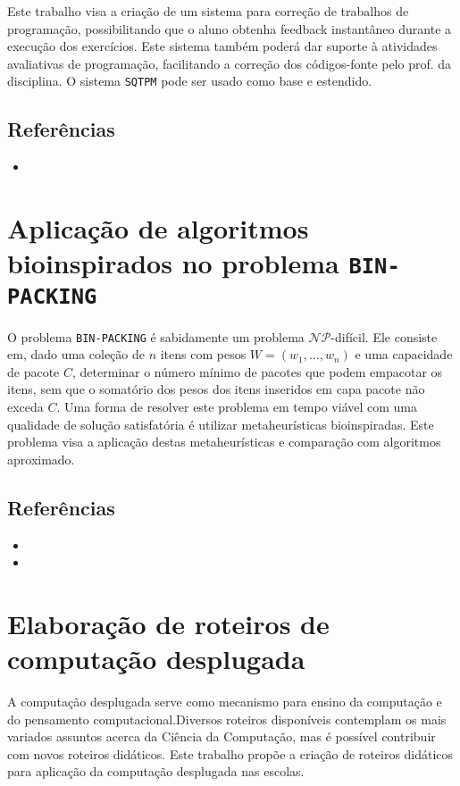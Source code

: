 \documentclass{article}
\begin{document}
Este trabalho visa a criação de um sistema para correção de trabalhos de programação, possibilitando que o aluno obtenha feedback instantâneo durante a execução dos exercícios. Este sistema também poderá dar suporte à atividades avaliativas de programação, facilitando a correção dos códigos-fonte pelo prof. da disciplina. O sistema {\tt SQTPM} pode ser usado como base e estendido.

\subsection*{Referências}


\begin{itemize}
	\item {}
\end{itemize}

\section*{Aplicação de algoritmos bioinspirados no problema {\tt BIN-PACKING}}

O problema {\tt BIN-PACKING} é sabidamente um problema $\mathcal{N\!P}$-difícil. Ele consiste em, dado uma coleção de $n$ itens com pesos $W=(w_1,\ldots,w_n)$ e uma capacidade de pacote $C$, determinar o número mínimo de pacotes que podem empacotar os itens, sem que o somatório dos pesos dos itens inseridos em capa pacote não exceda $C$. Uma forma de resolver este problema em tempo viável com uma qualidade de solução satisfatória é utilizar metaheurísticas bioinspiradas. Este problema visa a aplicação destas metaheurísticas e comparação com algoritmos aproximado.

\subsection*{Referências}

\begin{itemize}
	\item {}
	\item {}
\end{itemize}


\section*{Elaboração de roteiros de computação desplugada}

A computação desplugada serve como mecanismo para ensino da computação e do pensamento computacional.Diversos roteiros disponíveis contemplam os mais variados assuntos acerca da Ciência da Computação, mas é possível contribuir com novos roteiros didáticos. Este trabalho propõe a criação de roteiros didáticos para aplicação da computação desplugada nas escolas.
\end{document}
